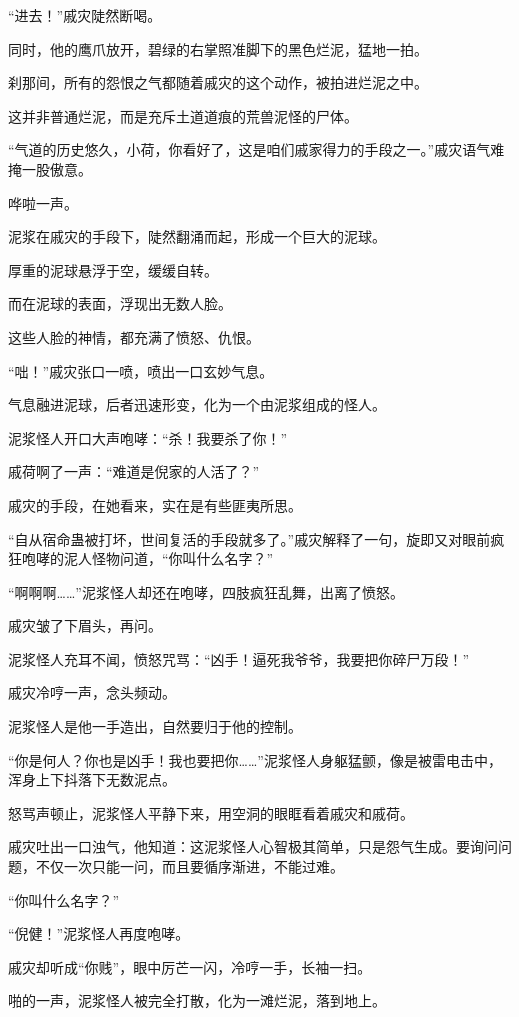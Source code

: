 \begin{this_body}
“进去！”戚灾陡然断喝。

同时，他的鹰爪放开，碧绿的右掌照准脚下的黑色烂泥，猛地一拍。

刹那间，所有的怨恨之气都随着戚灾的这个动作，被拍进烂泥之中。

这并非普通烂泥，而是充斥土道道痕的荒兽泥怪的尸体。

“气道的历史悠久，小荷，你看好了，这是咱们戚家得力的手段之一。”戚灾语气难掩一股傲意。

哗啦一声。

泥浆在戚灾的手段下，陡然翻涌而起，形成一个巨大的泥球。

厚重的泥球悬浮于空，缓缓自转。

而在泥球的表面，浮现出无数人脸。

这些人脸的神情，都充满了愤怒、仇恨。

“咄！”戚灾张口一喷，喷出一口玄妙气息。

气息融进泥球，后者迅速形变，化为一个由泥浆组成的怪人。

泥浆怪人开口大声咆哮：“杀！我要杀了你！”

戚荷啊了一声：“难道是倪家的人活了？”

戚灾的手段，在她看来，实在是有些匪夷所思。

“自从宿命蛊被打坏，世间复活的手段就多了。”戚灾解释了一句，旋即又对眼前疯狂咆哮的泥人怪物问道，“你叫什么名字？”

“啊啊啊……”泥浆怪人却还在咆哮，四肢疯狂乱舞，出离了愤怒。

戚灾皱了下眉头，再问。

泥浆怪人充耳不闻，愤怒咒骂：“凶手！逼死我爷爷，我要把你碎尸万段！”

戚灾冷哼一声，念头频动。

泥浆怪人是他一手造出，自然要归于他的控制。

“你是何人？你也是凶手！我也要把你……”泥浆怪人身躯猛颤，像是被雷电击中，浑身上下抖落下无数泥点。

怒骂声顿止，泥浆怪人平静下来，用空洞的眼眶看着戚灾和戚荷。

戚灾吐出一口浊气，他知道：这泥浆怪人心智极其简单，只是怨气生成。要询问问题，不仅一次只能一问，而且要循序渐进，不能过难。

“你叫什么名字？”

“倪健！”泥浆怪人再度咆哮。

戚灾却听成“你贱”，眼中厉芒一闪，冷哼一手，长袖一扫。

啪的一声，泥浆怪人被完全打散，化为一滩烂泥，落到地上。

\end{this_body}

